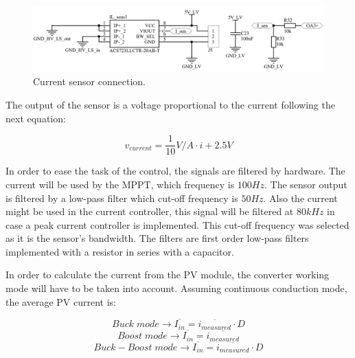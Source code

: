 \begin{figure}[H]
	\begin{center}
		\includegraphics[width=\textwidth]{../Pictures/P1/Sensors/current_sensor}
		\caption{Current sensor connection.}
		\label{current_sensor_application}
	\end{center}	
\end{figure}

The output of the sensor is a voltage proportional to the current following the next equation:

\begin{equation} 
v_{current} = \frac{1}{10}V/A \cdot i + 2.5V
\end{equation}

In order to ease the task of the control, the signals are filtered by hardware. The current will be used by the MPPT, which frequency is $100 Hz$. The sensor output is filtered by a low-pass filter which cut-off frequency is $50 Hz$. Also the current might be used in the current controller, this signal will be filtered at $80 kHz$ in case a peak current controller is implemented. This cut-off frequency was selected as it is the sensor's bandwidth. The filters are first order low-pass filters implemented with a resistor in series with a capacitor.

In order to calculate the current from the PV module, the converter working mode will have to be taken into account. Assuming continuous conduction mode, the average PV current is:


\begin{equation} 
	Buck \; mode \rightarrow \overline{I_{in}} = \overline{i_{measured}} \cdot D
\end{equation}
\begin{equation} 
Boost \; mode \rightarrow \overline{I_{in}} = \overline{i_{measured}}
\end{equation}
\begin{equation} 
Buck-Boost \; mode \rightarrow \overline{I_{in}} = \overline{i_{measured}} \cdot D
\end{equation}